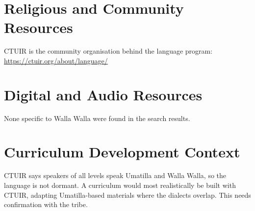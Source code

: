 \documentclass[12pt]{article}
\begin{document}
\section{Religious and Community Resources}
CTUIR is the community organisation behind the language program: \url{https://ctuir.org/about/language/}

\section{Digital and Audio Resources}
None specific to Walla Walla were found in the search results.

\section{Curriculum Development Context}
CTUIR says speakers of all levels speak Umatilla and Walla Walla, so the language is not dormant. A curriculum would most realistically be built with CTUIR, adapting Umatilla-based materials where the dialects overlap. This needs confirmation with the tribe.
\end{document}

